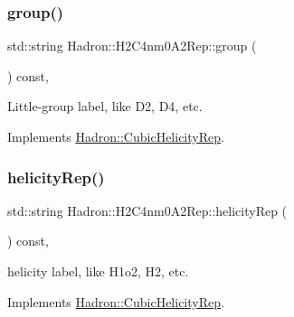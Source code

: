 \mbox{\label{structHadron_1_1H2C4nm0A2Rep_a91188ca54be99a0d11ac82323d7637ce}} 
\subsubsection{\texorpdfstring{group()}{group()}\hspace{0.1cm}{\footnotesize\ttfamily [5/5]}}
{\footnotesize\ttfamily std\+::string Hadron\+::\+H2\+C4nm0\+A2\+Rep\+::group (\begin{DoxyParamCaption}{ }\end{DoxyParamCaption}) const\hspace{0.3cm}{\ttfamily [inline]}, {\ttfamily [virtual]}}

Little-\/group label, like D2, D4, etc. 

Implements \mbox{\hyperlink{structHadron_1_1CubicHelicityRep_a101a7d76cd8ccdad0f272db44b766113}{Hadron\+::\+Cubic\+Helicity\+Rep}}.

\mbox{\label{structHadron_1_1H2C4nm0A2Rep_a8265918d931b1fc4c74311511fb81037}} 
\subsubsection{\texorpdfstring{helicityRep()}{helicityRep()}\hspace{0.1cm}{\footnotesize\ttfamily [1/3]}}
{\footnotesize\ttfamily std\+::string Hadron\+::\+H2\+C4nm0\+A2\+Rep\+::helicity\+Rep (\begin{DoxyParamCaption}{ }\end{DoxyParamCaption}) const\hspace{0.3cm}{\ttfamily [inline]}, {\ttfamily [virtual]}}

helicity label, like H1o2, H2, etc. 

Implements \mbox{\hyperlink{structHadron_1_1CubicHelicityRep_af1096946b7470edf0a55451cc662f231}{Hadron\+::\+Cubic\+Helicity\+Rep}}.

\mbox{\label{structHadron_1_1H2C4nm0A2Rep_a8265918d931b1fc4c74311511fb81037}} 
